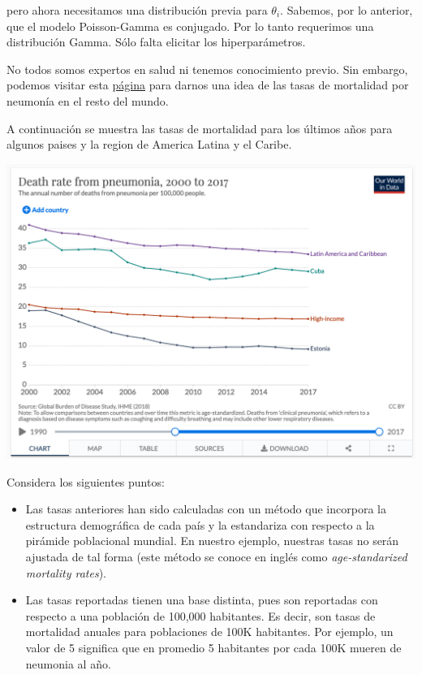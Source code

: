 \documentclass[
]{article}
\providecommand{\tightlist}{%
  \setlength{\itemsep}{0pt}\setlength{\parskip}{0pt}}
\begin{document}
pero ahora necesitamos una distribución previa para \(\theta_i.\)
Sabemos, por lo anterior, que el modelo Poisson-Gamma es conjugado. Por
lo tanto requerimos una distribución Gamma. Sólo falta elicitar los
hiperparámetros.

No todos somos expertos en salud ni tenemos conocimiento previo. Sin
embargo, podemos visitar esta
\href{https://ourworldindata.org/pneumonia}{página} para darnos una idea
de las tasas de mortalidad por neumonía en el resto del mundo.

A continuación se muestra las tasas de mortalidad para los últimos años
para algunos paises y la region de America Latina y el Caribe.

\begin{center}\includegraphics[width=0.99\linewidth]{imagenes/mortalidad-neumonia} \end{center}

Considera los siguientes puntos:

\begin{itemize}
\tightlist
\item
  Las tasas anteriores han sido calculadas con un método que incorpora
  la estructura demográfica de cada país y la estandariza con respecto a
  la pirámide poblacional mundial. En nuestro ejemplo, nuestras tasas no
  serán ajustada de tal forma (este método se conoce en inglés como
  \emph{age-standarized mortality rates}).
\item
  Las tasas reportadas tienen una base distinta, pues son reportadas con
  respecto a una población de 100,000 habitantes. Es decir, son tasas de
  mortalidad anuales para poblaciones de 100K habitantes. Por ejemplo,
  un valor de 5 significa que en promedio 5 habitantes por cada 100K
  mueren de neumonia al año.
\end{itemize}
\end{document}
